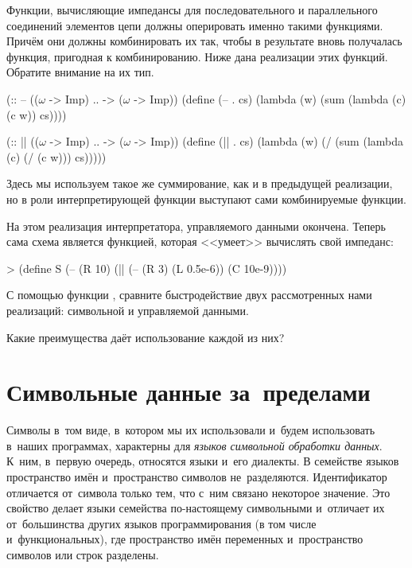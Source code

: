 Функции, вычисляющие импедансы для последовательного и параллельного соединений элементов цепи должны оперировать именно такими функциями. Причём они должны комбинировать их так, чтобы в результате вновь получалась функция, пригодная к комбинированию. Ниже дана реализации этих функций. Обратите внимание на их тип.
\begin{Definition}[emph={cs,c,w}]
(:: -- (($\omega$ -> Imp) .. -> ($\omega$ -> Imp))
  (define (-- . cs) 
    (lambda (w) (sum (lambda (c) (c w)) cs))))

(:: || (($\omega$ -> Imp) .. -> ($\omega$ -> Imp))
  (define (|| . cs) 
    (lambda (w) (/ (sum (lambda (c) (/ (c w))) cs)))))
\end{Definition}
Здесь мы используем такое же суммирование, как и в предыдущей реализации, но в роли интерпретирующей функции  выступают сами комбинируемые функции.

На этом реализация интерпретатора, управляемого данными окончена. Теперь сама схема является функцией, которая <<умеет>> вычислять свой импеданс:

\begin{SchemeCode}
> (define S
    (-- (R 10)
        (|| (-- (R 3)
                (L 0.5e-6))
            (C 10e-9))))
\end{SchemeCode}

\begin{Assignment}
 С помощью функции , сравните быстродействие двух рассмотренных нами реализаций: символьной и управляемой данными.

 Какие преимущества даёт использование каждой из них?
\end{Assignment}

\section{Символьные данные \mbox{за~пределами~\Scheme}}%
Символы в~том виде, в~котором мы их использовали и~будем использовать в~наших программах, характерны для \emph{языков символьной обработки данных}. К~ним, в~первую очередь, относятся языки  \Lisp и~его диалекты.
В семействе языков \Lisp пространство имён и~пространство символов не~разделяются. Идентификатор отличается от~символа только тем, что с~ним связано некоторое значение. Это свойство делает языки семейства \Lisp по-настоящему символьными и~отличает их от~большинства других языков программирования (в том числе и~функциональных), где пространство имён переменных и~пространство символов или строк разделены.

